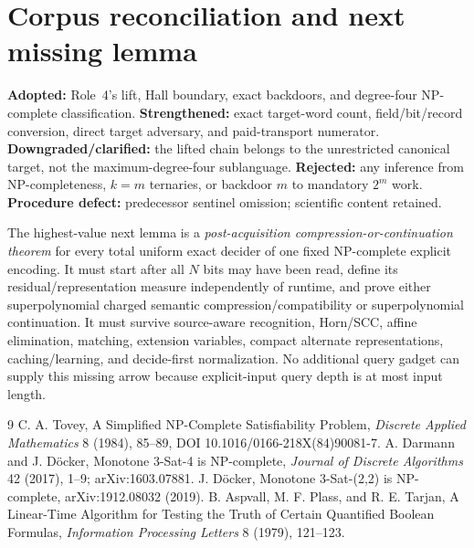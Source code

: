 \documentclass[11pt]{article}
\begin{document}
\section{Corpus reconciliation and next missing lemma}
\textbf{Adopted:} Role~4's lift, Hall boundary, exact backdoors, and degree-four NP-complete classification.  \textbf{Strengthened:} exact target-word count, field/bit/record conversion, direct target adversary, and paid-transport numerator.  \textbf{Downgraded/clarified:} the lifted chain belongs to the unrestricted canonical target, not the maximum-degree-four sublanguage.  \textbf{Rejected:} any inference from NP-completeness, $k=m$ ternaries, or backdoor $m$ to mandatory $2^m$ work.  \textbf{Procedure defect:} predecessor sentinel omission; scientific content retained.

The highest-value next lemma is a \emph{post-acquisition compression-or-continuation theorem} for every total uniform exact decider of one fixed NP-complete explicit encoding.  It must start after all $N$ bits may have been read, define its residual/representation measure independently of runtime, and prove either superpolynomial charged semantic compression/compatibility or superpolynomial continuation.  It must survive source-aware recognition, Horn/SCC, affine elimination, matching, extension variables, compact alternate representations, caching/learning, and decide-first normalization.  No additional query gadget can supply this missing arrow because explicit-input query depth is at most input length.

\begin{thebibliography}{9}
 C. A. Tovey, A Simplified NP-Complete Satisfiability Problem, \emph{Discrete Applied Mathematics} 8 (1984), 85--89, DOI 10.1016/0166-218X(84)90081-7.
 A. Darmann and J. D\"ocker, Monotone 3-Sat-4 is NP-complete, \emph{Journal of Discrete Algorithms} 42 (2017), 1--9; arXiv:1603.07881.
 J. D\"ocker, Monotone 3-Sat-(2,2) is NP-complete, arXiv:1912.08032 (2019).
 B. Aspvall, M. F. Plass, and R. E. Tarjan, A Linear-Time Algorithm for Testing the Truth of Certain Quantified Boolean Formulas, \emph{Information Processing Letters} 8 (1979), 121--123.
\end{thebibliography}
\end{document}
